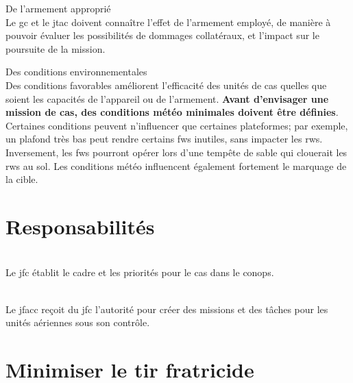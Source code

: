 \begin{e1}
\begin{e2}
		\item De l'armement approprié \\
		Le \gls{gc} et le \gls{jtac} doivent connaître l'effet de l'armement employé, de manière à pouvoir évaluer les possibilités de dommages collatéraux, et l'impact sur le poursuite de la mission.
		\item Des conditions environnementales \\
		Des conditions favorables améliorent l'efficacité des unités de \gls{cas} quelles que soient les capacités de l'appareil ou de l'armement. \textbf{Avant d'envisager une mission de \gls{cas}, des conditions météo minimales doivent être définies}. Certaines conditions peuvent n'influencer que certaines plateformes; par exemple, un plafond très bas peut rendre certains \glspl{fw} inutiles, sans impacter les \glspl{rw}. Inversement, les \glspl{fw} pourront opérer lors d'une tempête de sable qui clouerait les \glspl{rw} au sol. Les conditions météo influencent également fortement le marquage de la cible.	
		
	\end{e2}
\end{e1}

\section{Responsabilités}

\begin{e1}
	\item {} \\
	Le \gls{jfc} établit le cadre et les priorités pour le \gls{cas} dans le \gls{conops}.
	
	\item {} \\
	Le \gls{jfacc} reçoit du \gls{jfc} l'autorité pour créer des missions et des tâches pour les unités aériennes sous son contrôle.

\end{e1}
	
\section{Minimiser le tir fratricide}

